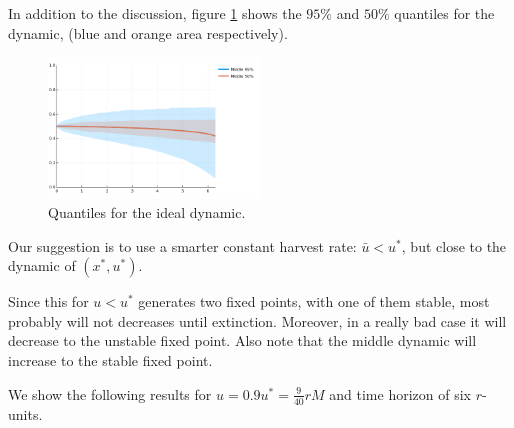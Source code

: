 In addition to the discussion, figure \ref{fig: NoiseIdealConstant2} shows the $95\%$ and $50\%$ quantiles for the dynamic, (blue and orange area respectively).

\begin{figure}[H]
	\begin{center}
		\includegraphics[width=0.5\textwidth]{NoiseIdealDynamic2.png}
		\caption{Quantiles for the ideal dynamic.}
		\label{fig: NoiseIdealConstant2}
	\end{center}
\end{figure}

Our suggestion is to use a smarter constant harvest rate: $\bar{u}<u^*$, but close to the dynamic of $(x^*,u^*)$.
 
Since this for $u<u^*$ generates two fixed points, with one of them stable, most probably will not decreases until extinction. Moreover, in a really bad case it will decrease to the unstable fixed point. Also note that the middle dynamic will increase to the stable fixed point. 

We show the following results for $u=0.9u^*=\frac{9}{40}rM$ and time horizon of six $r$-units. 

